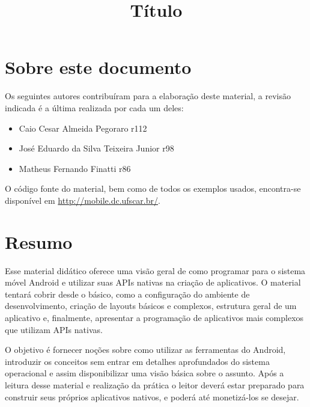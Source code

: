 \documentclass[a4paper,12pt,brazil,oneside]{book}
\title{Título}
\begin{document}



\cleardoublepage

\onehalfspace

\pagestyle{plain}


\chapter*{Sobre este documento}
Os seguintes autores contribuíram para a elaboração deste material, a revisão indicada é a última realizada por cada um deles:
  \begin{itemize}
	\item Caio Cesar Almeida Pegoraro \dotfill r112
	\item José Eduardo da Silva Teixeira Junior \dotfill r98
    \item Matheus Fernando Finatti \dotfill r86
  \end{itemize}
O código fonte do material, bem como de todos os exemplos usados, encontra-se disponível em \href{http://mobile.dc.ufscar.br/}{http://mobile.dc.ufscar.br/}.
\thispagestyle{empty}

\chapter*{Resumo}

\begin{singlespace}
Esse material didático oferece uma visão geral de como programar para o sistema móvel Android e utilizar suas APIs nativas na criação de aplicativos. O material tentará cobrir desde o básico, como a configuração do ambiente de desenvolvimento, criação de layouts básicos e complexos, estrutura geral de um aplicativo e, finalmente, apresentar a programação de aplicativos mais complexos que utilizam APIs nativas.

O objetivo é fornecer noções sobre como utilizar as ferramentas do Android, introduzir os conceitos sem entrar em detalhes aprofundados do sistema operacional e assim disponibilizar uma visão básica sobre o assunto.
Após a leitura desse material e realização da prática o leitor deverá estar preparado para construir seus próprios aplicativos nativos, e poderá até monetizá-los se desejar.
\end{singlespace}

\setcounter{tocdepth}{1} %
\end{document}
